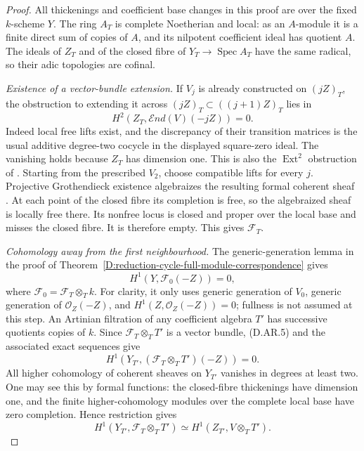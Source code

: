 \begin{proof}
All thickenings and coefficient base changes in this proof
are over the fixed $k$-scheme $Y$. The ring $A_T$ is complete
Noetherian and local: as an $A$-module it is a finite direct
sum of copies of $A$, and its nilpotent coefficient ideal has
quotient $A$. The ideals of $Z_T$ and of the closed fibre of
$Y_T\to\operatorname{Spec}A_T$ have the same radical, so their
adic topologies are cofinal.

\emph{Existence of a vector-bundle extension.}
If $V_j$ is already constructed on $(jZ)_T$, the obstruction
to extending it across $(jZ)_T\subset((j+1)Z)_T$ lies in
\[
 H^2(Z_T,\mathcal End(V)(-jZ))=0.
                                                        \tag{D.AR.4}
\]
Indeed local free lifts exist, and the discrepancy of their
transition matrices is the usual additive degree-two cocycle
in the displayed square-zero ideal. The vanishing holds
because $Z_T$ has dimension one. This is also the
$\operatorname{Ext}^2$ obstruction of
\citep[Lemma~91.10.4 and complete proof, Tag 08MF]
{StacksRelativeKahnB}.
Starting from the prescribed $V_2$, choose compatible lifts
for every $j$. Projective Grothendieck existence algebraizes
the resulting formal coherent sheaf
\citep[Lemma~30.24.3 and complete proof, Tag 0885]
{StacksRelativeKahnB}. At each point of the closed fibre its
completion is free, so the algebraized sheaf is locally free
there. Its nonfree locus is closed and proper over the local
base and misses the closed fibre. It is therefore empty.
This gives $\mathcal F_T$.

\emph{Cohomology away from the first neighbourhood.}
The generic-generation lemma in the proof of
Theorem~\ref{D:reduction-cycle-full-module-correspondence}
gives
\[
                  H^1(Y,\mathcal F_0(-Z))=0,
                                                        \tag{D.AR.5}
\]
where $\mathcal F_0=\mathcal F_T\otimes_Tk$.
For clarity, it only uses generic generation of $V_0$,
generic generation of $\mathcal O_Z(-Z)$, and
$H^1(Z,\mathcal O_Z(-Z))=0$; fullness is not assumed at this
step. An Artinian filtration of any coefficient algebra $T'$
has successive quotients copies of $k$. Since
$\mathcal F_T\otimes_TT'$ is a vector bundle, (D.AR.5) and
the associated exact sequences give
\[
 H^1(Y_{T'},(\mathcal F_T\otimes_TT')(-Z))=0.
                                                        \tag{D.AR.6}
\]
All higher cohomology of coherent sheaves on $Y_{T'}$
vanishes in degrees at least two. One may see this by formal
functions: the closed-fibre thickenings have dimension one,
and the finite higher-cohomology modules over the complete
local base have zero completion. Hence restriction gives
\[
 H^1(Y_{T'},\mathcal F_T\otimes_TT')
             \simeq H^1(Z_{T'},V\otimes_TT').
                                                        \tag{D.AR.7}
\]


\end{proof}
